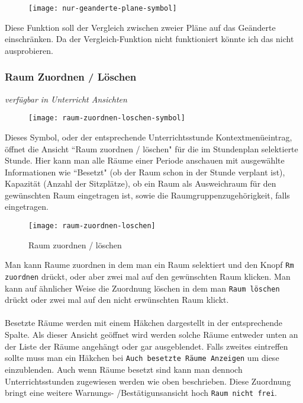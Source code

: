 \begin{wrapfigure}{r}{.05\textwidth}
	\vspace{-50pt}
	\texttt{[image: nur-geanderte-plane-symbol]}
	\vspace{-35pt}
\end{wrapfigure}

\noindent
Diese Funktion soll der Vergleich zwischen zweier Pläne auf das Geänderte einschränken. Da der Vergleich-Funktion nicht funktioniert könnte ich das nicht ausprobieren.

\subsubsection{Raum Zuordnen / Löschen}
\label{subsubsec:raum-zuordnen-loschen}
{\small\textit{verfügbar in Unterricht Ansichten\\}\par}

\begin{wrapfigure}{r}{.05\textwidth}
	\vspace{-50pt}
	\texttt{[image: raum-zuordnen-loschen-symbol]}
	\vspace{-35pt}
\end{wrapfigure}

\noindent
Dieses Symbol, oder der entsprechende Unterrichtsstunde Kontextmenüeintrag, öffnet die Ansicht ``Raum zuordnen / löschen" für die im Stundenplan selektierte Stunde. Hier kann man alle Räume einer Periode anschauen mit ausgewählte Informationen wie ``Besetzt" (ob der Raum schon in der Stunde verplant ist), Kapazität (Anzahl der Sitzplätze), ob ein Raum als Ausweichraum für den gewünschten Raum eingetragen ist, sowie die Raumgruppenzugehörigkeit, falls eingetragen.\\

\begin{wrapfigure}{r}{0.3\textwidth}
	\vspace{-14pt}
	\texttt{[image: raum-zuordnen-loschen]}
	\vspace{-15pt}
	\caption{Raum zuordnen / löschen}
	\label{fig:raum-zuordnen-loschen}
\end{wrapfigure}

\noindent
Man kann Raume zuordnen in dem man ein Raum selektiert und den Knopf \texttt{Rm zuordnen} drückt, oder aber zwei mal auf den gewünschten Raum klicken. Man kann auf ähnlicher Weise die Zuordnung löschen in dem man \texttt{Raum löschen} drückt oder zwei mal auf den nicht erwünschten Raum klickt.\\
\\
Besetzte Räume werden mit einem Häkchen dargestellt in der entsprechende Spalte. Als dieser Ansicht geöffnet wird werden solche Räume entweder unten an der Liste der Räume angehängt oder gar ausgeblendet. Falls zweites eintreffen sollte muss man ein Häkchen bei \texttt{Auch besetzte Räume Anzeigen} um diese einzublenden. Auch wenn Räume besetzt sind kann man dennoch Unterrichtsstunden zugewiesen werden wie oben beschrieben. Diese Zuordnung bringt eine weitere Warnungs- /Bestätigunsansicht hoch \texttt{Raum nicht frei}.\\

